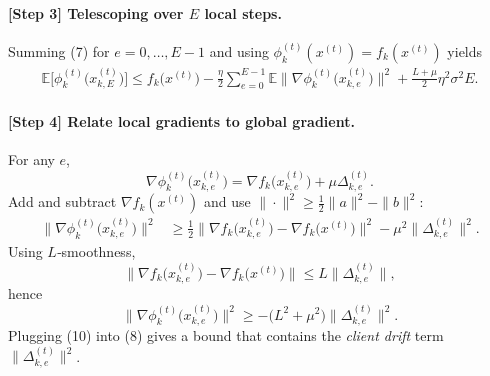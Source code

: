 \documentclass[11pt]{article}
\newcommand{\E}{\mathbb{E}}
\begin{document}
\paragraph{[Step 3] Telescoping over $E$ local steps.}
Summing (7) for $e=0,\dots,E-1$ and using $\phi_k^{(t)}(x^{(t)})=f_k(x^{(t)})$ yields
\begin{align}
\E\bigl[\phi_k^{(t)}\!\bigl(x^{(t)}_{k,E}\bigr)\bigr]
\le
f_k\!\bigl(x^{(t)}\bigr)
-\frac{\eta}{2}\sum_{e=0}^{E-1}
\E\bigl\|\nabla\phi_k^{(t)}\!\bigl(x^{(t)}_{k,e}\bigr)\bigr\|^2
+\frac{L+\mu}{2}\eta^2\sigma^2 E .
\tag{8}
\end{align}

\paragraph{[Step 4] Relate local gradients to global gradient.}
For any $e$,
\[
\nabla\phi_k^{(t)}\!\bigl(x^{(t)}_{k,e}\bigr)
= \nabla f_k\!\bigl(x^{(t)}_{k,e}\bigr)+\mu\Delta^{(t)}_{k,e}.
\]
Add and subtract $\nabla f_k(x^{(t)})$ and use $\|\cdot\|^2\ge \frac12\|a\|^2-\|b\|^2$:
\begin{align}
\bigl\|\nabla\phi_k^{(t)}\!\bigl(x^{(t)}_{k,e}\bigr)\bigr\|^2
&\ge \frac12\bigl\|\nabla f_k\!\bigl(x^{(t)}_{k,e}\bigr)-\nabla f_k\!\bigl(x^{(t)}\bigr)\bigr\|^2
-\mu^2\|\Delta^{(t)}_{k,e}\|^2 .
\tag{9}
\end{align}
Using $L$‑smoothness,
\[
\bigl\|\nabla f_k\!\bigl(x^{(t)}_{k,e}\bigr)-\nabla f_k\!\bigl(x^{(t)}\bigr)\bigr\|
\le L\|\Delta^{(t)}_{k,e}\|,
\]
hence
\[
\bigl\|\nabla\phi_k^{(t)}\!\bigl(x^{(t)}_{k,e}\bigr)\bigr\|^2
\ge -\bigl(L^2+\mu^2\bigr)\|\Delta^{(t)}_{k,e}\|^2 .
\tag{10}
\]
Plugging (10) into (8) gives a bound that contains the \emph{client drift} term
$\|\Delta^{(t)}_{k,e}\|^2$.
\end{document}
